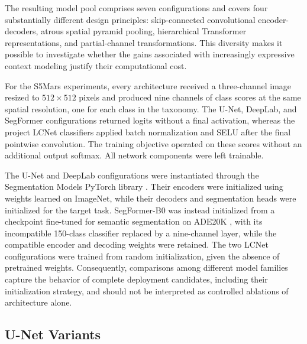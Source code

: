 The resulting model pool comprises seven configurations and covers four substantially different design principles: skip-connected convolutional encoder-decoders, atrous spatial pyramid pooling, hierarchical Transformer representations, and partial-channel transformations. This diversity makes it possible to investigate whether the gains associated with increasingly expressive context modeling justify their computational cost. %

For the S5Mars experiments, every architecture received a three-channel image resized to \(512 \times 512\) pixels and produced nine channels of class scores at the same spatial resolution, one for each class in the taxonomy. The U-Net, DeepLab, and SegFormer configurations returned logits without a final activation, whereas the project LCNet classifiers applied batch normalization and SELU after the final pointwise convolution. The training objective operated on these scores without an additional output softmax. All network components were left trainable.

The U-Net and DeepLab configurations were instantiated through the Segmentation Models PyTorch library \cite{iakubovskii2019smp}. Their encoders were initialized using weights learned on ImageNet, while their decoders and segmentation heads were initialized for the target task. SegFormer-B0 was instead initialized from a checkpoint fine-tuned for semantic segmentation on ADE20K \cite{nvidiaSegformerB0}, with its incompatible 150-class classifier replaced by a nine-channel layer, while the compatible encoder and decoding weights were retained. The two LCNet configurations were trained from random initialization, given the absence of pretrained weights. Consequently, comparisons among different model families capture the behavior of complete deployment candidates, including their initialization strategy, and should not be interpreted as controlled ablations of architecture alone.

\subsection{U-Net Variants}

